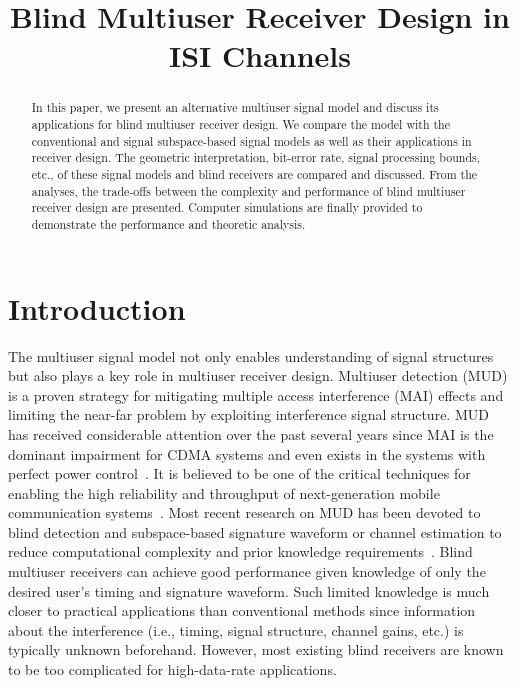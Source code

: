 \documentclass[conference]{IEEEtran}
\begin{document}
\title{Blind Multiuser Receiver Design in ISI Channels}
\author{
 \and
{}
}

\maketitle
\begin{abstract}\small
In this paper, we present an alternative multiuser signal model
and discuss its applications for blind multiuser receiver design.
We compare the model with the conventional  and
signal subspace-based signal models as well as their applications
in receiver design. The geometric interpretation, bit-error rate,
signal processing bounds, etc., of these signal models and blind
receivers are compared and discussed.  From the analyses,
the trade-offs between the complexity and performance of blind
multiuser receiver design are presented. Computer simulations
are finally provided to demonstrate the performance and theoretic
analysis.
\end{abstract}

\section{Introduction}
The multiuser signal model not only enables understanding of signal
structures but also plays a key role in multiuser receiver design.
Multiuser detection (MUD) is a proven strategy for mitigating multiple
access interference (MAI) effects and limiting the near-far problem
by exploiting interference signal structure. MUD has received considerable attention over the past several years since MAI is the dominant
impairment for CDMA systems and even exists in the systems with
perfect power control~\cite{Verd98}.  It is believed to be one
of the critical techniques for enabling the high reliability and throughput of next-generation mobile communication systems~\cite{Andr05}. Most recent
research on MUD has been devoted to blind detection and subspace-based signature
waveform or channel estimation to reduce computational complexity and prior
knowledge requirements~\cite{Honi95,Torl97,Wang98,Zhang02,Wang03d,Wang05A,Wang05B}.
Blind multiuser receivers can achieve good performance given
knowledge of only the desired user's timing and signature waveform.
Such limited knowledge is much closer to practical applications than conventional methods since information about the interference (i.e., timing, signal structure, channel gains, etc.) is typically unknown beforehand. However, most
existing blind receivers are known to be too complicated for
high-data-rate applications.
\end{document}
